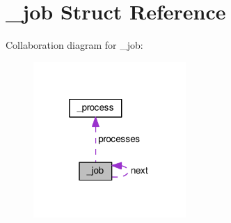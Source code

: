 \hypertarget{struct__job}{\section{\-\_\-job Struct Reference}
\label{struct__job}
}


Collaboration diagram for \-\_\-job\-:\nopagebreak
\begin{figure}[H]
\begin{center}
\leavevmode
\includegraphics[width=164pt]{struct__job__coll__graph}
\end{center}
\end{figure}
